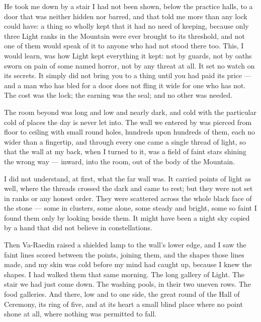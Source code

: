 He took me down by a stair I had not been shown, below the practice halls, to a door that was neither hidden nor barred, and that told me more than any lock could have: 
a thing so wholly kept that it had no need of keeping, because only three Light ranks in the Mountain were ever brought to its threshold, 
and not one of them would speak of it to anyone who had not stood there too. 
This, I would learn, was how Light kept everything it kept: not by guards, not by oaths sworn on pain of some named horror, not by any threat at all. 
It set no watch on its secrets. 
It simply did not bring you to a thing until you had paid its price --- and a man who has bled for a door does not fling it wide for one who has not. 
The cost was the lock; 
the earning was the seal; 
and no other was needed.\par

The room beyond was long and low and nearly dark, and cold with the particular cold of places the day is never let into. 
The wall we entered by was pierced from floor to ceiling with small round holes, hundreds upon hundreds of them, each no wider than a fingertip, 
and through every one came a single thread of light, so that the wall at my back, when I turned to it, was a field of faint stars shining the wrong way --- 
inward, into the room, out of the body of the Mountain.\par

I did not understand, at first, what the far wall was. 
It carried points of light as well, where the threads crossed the dark and came to rest; but they were not set in ranks or any honest order. 
They were scattered across the whole black face of the stone --- some in clusters, some alone, some steady and bright, some so faint I found them only by looking beside them. 
It might have been a night sky copied by a hand that did not believe in constellations.\par

Then Va-Raedin raised a shielded lamp to the wall's lower edge, and I saw the faint lines scored between the points, joining them, and the shapes those lines made, 
and my skin was cold before my mind had caught up, because I knew the shapes. 
I had walked them that same morning. 
The long gallery of Light. 
The stair we had just come down. 
The washing pools, in their two uneven rows. 
The food galleries. 
And there, low and to one side, the great round of the Hall of Ceremony, its ring of five, and at its heart a small blind place where no point shone at all, 
where nothing was permitted to fall.\par

